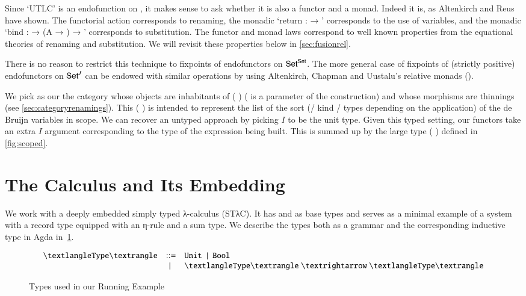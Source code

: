 Since `UTLC' is an endofunction on , it makes sense to ask whether it is
also a functor and a monad. Indeed it is, as Altenkirch and Reus have shown. The
functorial action corresponds to renaming, the monadic
`return :  →  '
corresponds to the use of variables, and the monadic
`bind :   → (A →  ) →  '
corresponds to substitution. The
functor and monad laws correspond to well known properties from the equational
theories of renaming and substitution. We will revisit these properties
below in \cref{sec:fusionrel}.

There is no reason to restrict this technique to fixpoints of endofunctors on
$\AD{Set}^{\AD{Set}}$. The more general case of fixpoints of (strictly positive)
endofunctors on $\AD{Set}^{\AB{J}}$ can be endowed with similar operations by
using Altenkirch, Chapman and Uustalu's relative monads
(\citeyear{Altenkirch2010, JFR4389}).

We pick as our  the category whose objects are inhabitants of
({ }) ( is a parameter of the construction) and whose morphisms
are thinnings (see \cref{sec:categoryrenamings}).  This ({ }) is
intended to represent the list of the sort (/ kind / types depending on the
application) of the de Bruijn variables in scope. We can recover an untyped
approach by picking $I$ to be the unit type. Given this typed setting, our functors
take an extra $I$ argument corresponding to the type of the expression being built.
This is summed up by the large type ({ }) defined in
\cref{fig:scoped}.

\section{The Calculus and Its Embedding}
\label{sec:stlccalculus}

We work with a deeply embedded simply typed λ-calculus (STλC). It has \unit{} and
\bool{} as base types and serves as a minimal example of a system with a record
type equipped with an η-rule and a sum type. We describe the types both as a
grammar and the corresponding inductive type in Agda in~\cref{fig:type}.

\begin{figure}[h]
\begin{minipage}{0.5\textwidth}
\[
\begin{array}{lcl}
\nonterminal{\type{}}
  & ::=    & \unit{}
  ~ \mid{} ~ \bool{} \\
  & \mid{} & \arrow{\nonterminal{\type{}}}{\nonterminal{\type{}}}
\end{array}
\]
\end{minipage}
\begin{minipage}{0.5\textwidth}
\end{minipage}
\caption{Types used in our Running Example\label{fig:type}}
\end{figure}

